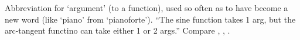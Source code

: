  Abbreviation for `argument' (to a function), used so often as to have become a new word (like `piano' from `pianoforte').
``The sine function takes 1 arg, but the arc-tangent functino can take either 1 or 2 args.'' Compare , ,
.

